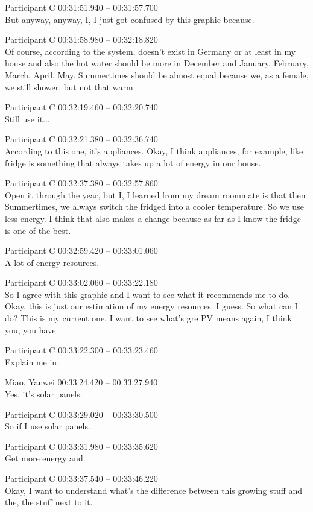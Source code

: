 {Participant C 00:31:51.940 -- 00:31:57.700 \\
But anyway, anyway, I, I just got confused by this graphic because.

Participant C 00:31:58.980 -- 00:32:18.820 \\
Of course, according to the system, doesn't exist in Germany or at least in my house and also the hot water should be more in December and January, February, March, April, May. Summertimes should be almost equal because we, as a female, we still shower, but not that warm.

Participant C 00:32:19.460 -- 00:32:20.740 \\
Still use it...

Participant C 00:32:21.380 -- 00:32:36.740 \\
According to this one, it's appliances. Okay, I think appliances, for example, like fridge is something that always takes up a lot of energy in our house.

Participant C 00:32:37.380 -- 00:32:57.860 \\
Open it through the year, but I, I learned from my dream roommate is that then Summertimes, we always switch the fridged into a cooler temperature. So we use less energy. I think that also makes a change because as far as I know the fridge is one of the best.

Participant C 00:32:59.420 -- 00:33:01.060 \\
A lot of energy resources.

Participant C 00:33:02.060 -- 00:33:22.180 \\
So I agree with this graphic and I want to see what it recommends me to do. Okay, this is just our estimation of my energy resources. I guess. So what can I do? This is my current one. I want to see what's gre PV means again, I think you, you have.

Participant C 00:33:22.300 -- 00:33:23.460 \\
Explain me in.

Miao, Yanwei 00:33:24.420 -- 00:33:27.940 \\
Yes, it's solar panels.

Participant C 00:33:29.020 -- 00:33:30.500 \\
So if I use solar panels.

Participant C 00:33:31.980 -- 00:33:35.620 \\
Get more energy and.

Participant C 00:33:37.540 -- 00:33:46.220 \\
Okay, I want to understand what's the difference between this growing stuff and the, the stuff next to it.

}
